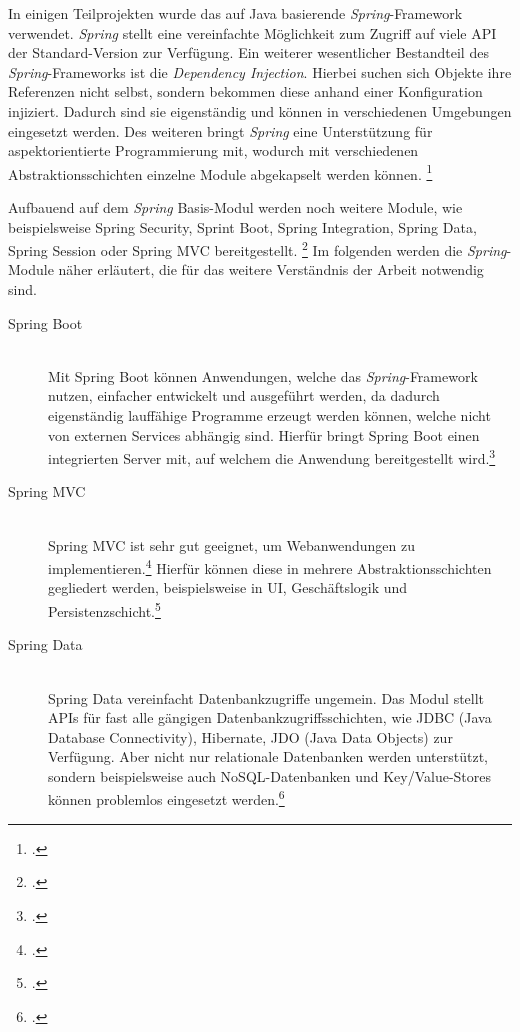 In einigen Teilprojekten wurde das auf Java basierende \textit{Spring}-Framework verwendet.
\textit{Spring} stellt eine vereinfachte Möglichkeit zum Zugriff auf viele \ac{API} der
Standard-Version zur Verfügung. Ein weiterer wesentlicher Bestandteil des
\textit{Spring}-Frameworks ist die \textit{Dependency Injection}. Hierbei suchen sich Objekte ihre
Referenzen nicht selbst, sondern bekommen diese anhand einer Konfiguration injiziert. Dadurch sind
sie eigenständig und können in verschiedenen Umgebungen eingesetzt werden. Des weiteren bringt
\textit{Spring} eine Unterstützung für aspektorientierte Programmierung mit, wodurch mit
verschiedenen Abstraktionsschichten einzelne Module abgekapselt werden können. \footcite[Vgl.][2]{spring3}

Aufbauend auf dem \textit{Spring} Basis-Modul werden noch weitere Module, wie beispielsweise Spring
Security, Sprint Boot, Spring Integration, Spring Data, Spring Session oder Spring MVC
bereitgestellt.
\footcite[Vgl.][2]{springPivotal} Im folgenden werden die \textit{Spring}-Module näher erläutert,
die für das weitere Verständnis der Arbeit notwendig sind.

\begin{description}
  \item[Spring Boot] \hfill \\
    Mit Spring Boot können Anwendungen, welche das \textit{Spring}-Framework nutzen, einfacher
    entwickelt und ausgeführt werden, da dadurch eigenständig lauffähige Programme erzeugt werden können, welche nicht von externen Services abhängig sind. Hierfür bringt Spring Boot einen integrierten Server mit, auf welchem die Anwendung bereitgestellt wird.\footcite[Vgl.][1]{springBoot}
  \item[Spring MVC] \hfill \\
    Spring MVC ist sehr gut geeignet, um Webanwendungen zu implementieren.\footcite[Vgl.][3]{spring3}
    Hierfür können diese in mehrere Abstraktionsschichten gegliedert werden, beispielsweise in
    \ac{UI}, Geschäftslogik und Persistenzschicht.\footcite[Vgl.][21]{springMvc}
  \item[Spring Data] \hfill \\
    Spring Data vereinfacht Datenbankzugriffe ungemein. Das Modul stellt \acp{API} für fast alle
    gängigen Datenbankzugriffsschichten, wie JDBC (Java Database Connectivity), Hibernate, JDO
    (Java Data Objects) zur Verfügung. Aber nicht nur relationale Datenbanken werden unterstützt,
    sondern beispielsweise auch NoSQL-Datenbanken und Key/Value-Stores können problemlos eingesetzt
    werden.\footcite[Vgl.][3f]{springData}
\end{description}

